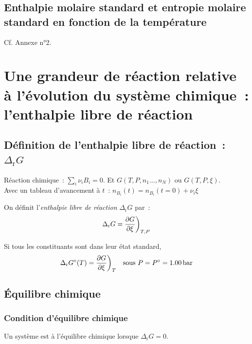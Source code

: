 \documentclass{article}
\newcommand{\Dr}{\Delta_{\mathrm{r}}}
\begin{document}
\subsection{Enthalpie molaire standard et entropie molaire standard en fonction de la température}
Cf. \textsf{Annexe n°2}.

\section{Une grandeur de réaction relative à l'évolution du système chimique~: l'enthalpie libre de réaction}
\subsection{Définition de l'enthalpie libre de réaction~: $\Dr G$}
\begin{tableau}
    Réaction chimique~: $\sum_i \nu_i B_i =0$. Et $G(T,P,n_1\dots,n_N)$ ou $G(T,P,\xi)$.\\

    Avec un tableau d'avancement à $t$~: $n_{B_i}(t) = n_{B_i}(t=0) + \nu_i \xi$
    \begin{enonce}
        On définit l'\textit{enthalpie libre de réaction} $\Dr G$ par~:
        $$\Dr G = \pdv{G}{\xi}\bigg)_{T,P}$$
    \end{enonce}
    Si tous les constituants sont dans leur état standard,
    $$\Dr G^\circ(T)=\pdv{G}{\xi}\bigg)_T\quad\text{sous } P=P^\circ=\SI{1,00}{\bar}$$
\end{tableau}


\subsection{Équilibre chimique}
\subsubsection{Condition d'équilibre chimique}
\begin{tableau}
    \begin{important}
        Un système est à l'équilibre chimique lorsque $\Dr G = 0$.
    \end{important}
\end{tableau}
\end{document}

